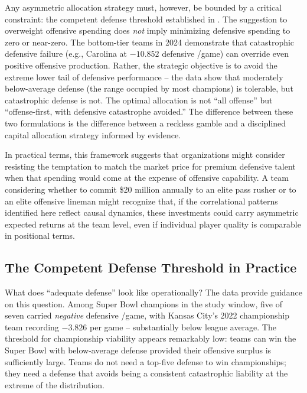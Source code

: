 Any asymmetric allocation strategy must, however, be bounded by a critical
constraint: the competent defense threshold established in
. The suggestion to overweight offensive
spending does \emph{not} imply minimizing defensive spending to zero or near-zero.
The bottom-tier teams in 2024 demonstrate that catastrophic defensive failure
(e.g., Carolina at $-10.852$ defensive \xvoa{}/game) can override even positive
offensive production. Rather, the strategic objective is to avoid the extreme
lower tail of defensive performance -- the data show that moderately
below-average defense (the range occupied by most champions) is tolerable, but
catastrophic defense is not. The optimal allocation is not ``all offense'' but
``offense-first, with defensive catastrophe avoided.'' The difference between
these two formulations is the difference between a reckless gamble and a
disciplined capital allocation strategy informed by evidence.

In practical terms, this framework suggests that organizations might consider
resisting the temptation to match the market price for premium defensive talent
when that spending would come at the expense of offensive capability. A team
considering whether to commit \$20 million annually to an elite pass rusher or
to an elite offensive lineman might recognize that, if the correlational
patterns identified here reflect causal dynamics, these investments could carry
asymmetric expected returns at the team level, even if individual player
quality is comparable in positional terms.

\subsection{The Competent Defense Threshold in Practice}
\label{sec:threshold-practice}

What does ``adequate defense'' look like operationally? The data provide
guidance on this question. Among Super Bowl champions in the study window, five
of seven carried \emph{negative} defensive \xvoa{}/game, with Kansas City's
2022 championship team recording $-3.826$ per game -- substantially below
league average. The threshold for championship viability appears remarkably
low: teams can win the Super Bowl with below-average defense provided their
offensive surplus is sufficiently large. Teams do not need a top-five defense
to win championships; they need a defense that avoids being a consistent
catastrophic liability at the extreme of the distribution.

